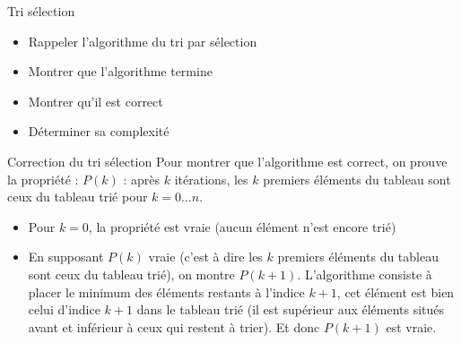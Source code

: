 \documentclass[10pt]{beamer}
\begin{document}
\begin{frame}[fragile]{\Ctitle}{\stitle}
    \begin{exampleblock}{Tri sélection}
        \begin{itemize}
            \item<1-> Rappeler l'algorithme du tri par sélection \\
            \item<3-> Montrer que l'algorithme termine\\
            \item<5-> Montrer qu'il est correct
            \item<6-> Déterminer sa complexité
        \end{itemize}
    \end{exampleblock}
\end{frame}


\begin{frame}[fragile]{\Ctitle}{\stitle}
    \begin{exampleblock}{Correction du tri sélection}
        \textcolor{OliveGreen}{Pour montrer que l'algorithme est correct, on prouve  la propriété : $P(k)$ : \og{} après $k$ itérations, les $k$ premiers éléments du tableau sont ceux du tableau trié pour $k=0 \dots n$.}
        \begin{itemize}
            \item<2->\textcolor{OliveGreen}{Pour $k=0$, la propriété est vraie (aucun élément n'est encore trié)}
            \item<3->\textcolor{OliveGreen}{En supposant $P(k)$ vraie (c'est à dire les $k$ premiers éléments du tableau sont ceux du tableau trié), on montre $P(k+1)$. L'algorithme consiste à placer le minimum des éléments restants à l'indice $k+1$, cet élément est bien celui d'indice $k+1$ dans le tableau trié (il est supérieur aux éléments situés avant et inférieur à ceux qui restent à trier). Et donc $P(k+1)$ est vraie.}
        \end{itemize}
    \end{exampleblock}
\end{frame}
\end{document}
